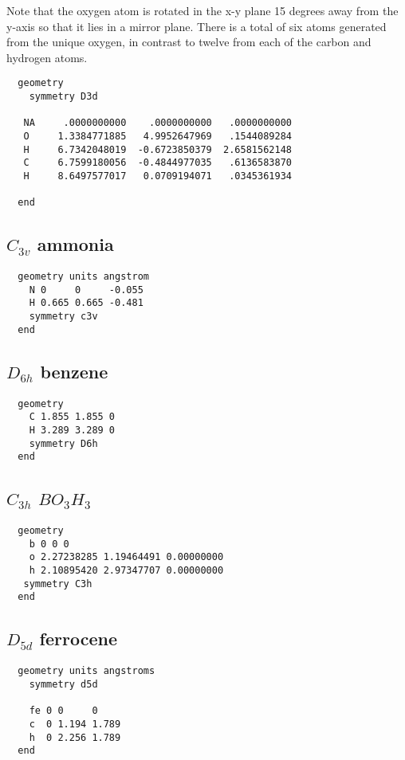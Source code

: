   Note that the oxygen atom is rotated in the x-y plane 15
  degrees away from the y-axis so that it lies in a mirror
  plane.  There is a total of six atoms generated from the
  unique oxygen, in contrast to twelve from each of the carbon
  and hydrogen atoms.

\begin{verbatim}
  geometry
    symmetry D3d

   NA     .0000000000    .0000000000   .0000000000
   O     1.3384771885   4.9952647969   .1544089284
   H     6.7342048019  -0.6723850379  2.6581562148
   C     6.7599180056  -0.4844977035   .6136583870
   H     8.6497577017   0.0709194071   .0345361934

  end
\end{verbatim}

  \subsection{\protect$C_{3v}$ ammonia}

\begin{verbatim}
  geometry units angstrom
    N 0     0     -0.055 
    H 0.665 0.665 -0.481 
    symmetry c3v
  end
\end{verbatim}

  \subsection{\protect$D_{6h}$ benzene}

\begin{verbatim}
  geometry
    C 1.855 1.855 0 
    H 3.289 3.289 0 
    symmetry D6h
  end
\end{verbatim}

  \subsection{\protect$C_{3h}$ \protect$BO_3H_3$}

\begin{verbatim}
  geometry
    b 0 0 0 
    o 2.27238285 1.19464491 0.00000000 
    h 2.10895420 2.97347707 0.00000000 
   symmetry C3h
  end
\end{verbatim}

  \subsection{\protect$D_{5d}$ ferrocene}

\begin{verbatim}
  geometry units angstroms
    symmetry d5d

    fe 0 0     0 
    c  0 1.194 1.789 
    h  0 2.256 1.789 
  end
\end{verbatim}

